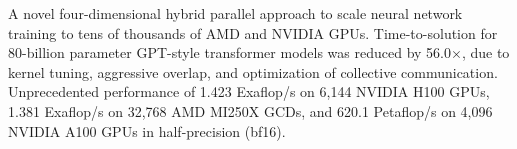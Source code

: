 
A novel four-dimensional hybrid parallel approach to scale neural network
training to tens of thousands of AMD and NVIDIA GPUs. Time-to-solution for
80-billion parameter GPT-style transformer models was reduced by
56.0$\times$, due to kernel tuning, aggressive overlap, and
optimization of collective communication. Unprecedented performance of 1.423
Exaflop/s on 6,144 NVIDIA H100 GPUs, 1.381 Exaflop/s on 32,768 AMD MI250X GCDs,
and 620.1 Petaflop/s on 4,096 NVIDIA A100 GPUs in half-precision (bf16).
